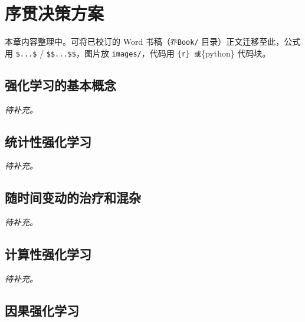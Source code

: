 \documentclass[
  chinese-hans,
  letterpaper,
  DIV=11,
  numbers=noendperiod]{scrreprt}
\begin{document}

\chapter{序贯决策方案}\label{ux5e8fux8d2fux51b3ux7b56ux65b9ux6848}

\begin{tcolorbox}[enhanced jigsaw, arc=.35mm, bottomrule=.15mm, bottomtitle=1mm, breakable, colback=white, colbacktitle=quarto-callout-note-color!10!white, colframe=quarto-callout-note-color-frame, coltitle=black, left=2mm, leftrule=.75mm, opacityback=0, opacitybacktitle=0.6, rightrule=.15mm, title=\textcolor{quarto-callout-note-color}{\faInfo}\hspace{0.5em}{编写说明}, titlerule=0mm, toprule=.15mm, toptitle=1mm]

本章内容整理中。可将已校订的 Word 书稿（\texttt{乔Book/}
目录）正文迁移至此，公式用 \texttt{\$...\$} /
\texttt{\$\$...\$\$}，图片放 \texttt{images/}，代码用
\texttt{\{r\}\ 或}\{python\} 代码块。

\end{tcolorbox}

\section{强化学习的基本概念}\label{ux5f3aux5316ux5b66ux4e60ux7684ux57faux672cux6982ux5ff5}

\emph{待补充。}

\section{统计性强化学习}\label{ux7edfux8ba1ux6027ux5f3aux5316ux5b66ux4e60}

\emph{待补充。}

\section{随时间变动的治疗和混杂}\label{ux968fux65f6ux95f4ux53d8ux52a8ux7684ux6cbbux7597ux548cux6df7ux6742}

\emph{待补充。}

\section{计算性强化学习}\label{ux8ba1ux7b97ux6027ux5f3aux5316ux5b66ux4e60}

\emph{待补充。}

\section{因果强化学习}\label{ux56e0ux679cux5f3aux5316ux5b66ux4e60}
\end{document}
